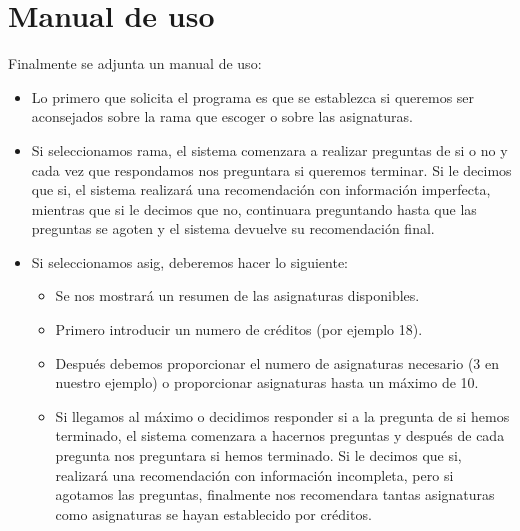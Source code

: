 \chapter{Manual de uso}
Finalmente se adjunta un manual de uso:
\begin{itemize}
   \item Lo primero que solicita el programa es que se establezca si queremos ser aconsejados sobre la rama que escoger o sobre las asignaturas.
   \item Si seleccionamos rama, el sistema comenzara a realizar preguntas de si o no y cada vez que respondamos nos preguntara si queremos terminar. Si le decimos que si, el sistema realizará una recomendación con información imperfecta, mientras que si le decimos que no, continuara preguntando hasta que las preguntas se agoten y el sistema devuelve su recomendación final.
   \item Si seleccionamos asig, deberemos hacer lo siguiente:
   \begin{itemize}
      \item Se nos mostrará un resumen de las asignaturas disponibles.
      \item Primero introducir un numero de créditos (por ejemplo 18).
      \item Después debemos proporcionar el numero de asignaturas necesario (3 en nuestro ejemplo) o proporcionar asignaturas hasta un máximo de 10.
      \item Si llegamos al máximo o decidimos responder si a la pregunta de si hemos terminado, el sistema comenzara a hacernos preguntas y después de cada pregunta nos preguntara si hemos terminado. Si le decimos que si, realizará una recomendación con información incompleta, pero si agotamos las preguntas, finalmente nos recomendara tantas asignaturas como asignaturas se hayan establecido por créditos.
   \end{itemize}
\end{itemize}
